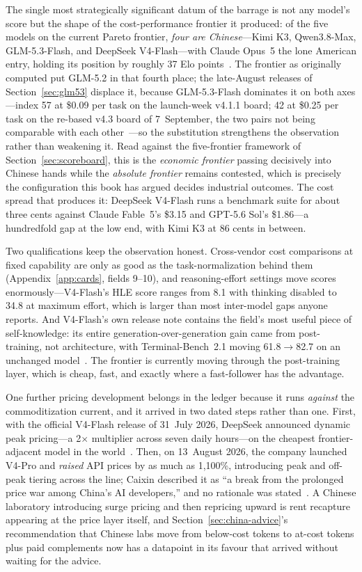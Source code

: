 The single most strategically significant datum of the barrage is not any model's score but the shape of the cost-performance frontier it produced: of the five models on the current Pareto frontier, \emph{four are Chinese}---Kimi K3, Qwen3.8-Max, GLM-5.3-Flash, and DeepSeek V4-Flash---with Claude Opus~5 the lone American entry, holding its position by roughly 37 Elo points~\cite{pareto-frontier}. The frontier as originally computed put GLM-5.2 in that fourth place; the late-August releases of Section~\ref{sec:glm53} displace it, because GLM-5.3-Flash dominates it on both axes---index 57 at \$0.09 per task on the launch-week v4.1.1 board; 42 at \$0.25 per task on the re-based v4.3 board of 7~September, the two pairs not being comparable with each other~\cite{aa-v43,glm53-flash-agentic}---so the substitution strengthens the observation rather than weakening it. Read against the five-frontier framework of Section~\ref{sec:scoreboard}, this is the \emph{economic frontier} passing decisively into Chinese hands while the \emph{absolute frontier} remains contested, which is precisely the configuration this book has argued decides industrial outcomes. The cost spread that produces it: DeepSeek V4-Flash runs a benchmark suite for about three cents against Claude Fable~5's \$3.15 and GPT-5.6 Sol's \$1.86---a hundredfold gap at the low end, with Kimi K3 at 86 cents in between.

Two qualifications keep the observation honest. Cross-vendor cost comparisons at fixed capability are only as good as the task-normalization behind them (Appendix~\ref{app:cards}, fields 9--10), and reasoning-effort settings move scores enormously---V4-Flash's HLE score ranges from 8.1 with thinking disabled to 34.8 at maximum effort, which is larger than most inter-model gaps anyone reports. And V4-Flash's own release note contains the field's most useful piece of self-knowledge: its entire generation-over-generation gain came from post-training, not architecture, with Terminal-Bench~2.1 moving 61.8$\to$82.7 on an unchanged model~\cite{v4flash}. The frontier is currently moving through the post-training layer, which is cheap, fast, and exactly where a fast-follower has the advantage.

One further pricing development belongs in the ledger because it runs \emph{against} the commoditization current, and it arrived in two dated steps rather than one. First, with the official V4-Flash release of 31~July 2026, DeepSeek announced dynamic peak pricing---a 2$\times$ multiplier across seven daily hours---on the cheapest frontier-adjacent model in the world~\cite{v4flash}. Then, on 13~August 2026, the company launched V4-Pro and \emph{raised} API prices by as much as 1{,}100\%, introducing peak and off-peak tiering across the line; Caixin described it as ``a break from the prolonged price war among China's AI developers,'' and no rationale was stated~\cite{deepseek-raise}. A Chinese laboratory introducing surge pricing and then repricing upward is rent recapture appearing at the price layer itself, and Section~\ref{sec:china-advice}'s recommendation that Chinese labs move from below-cost tokens to at-cost tokens plus paid complements now has a datapoint in its favour that arrived without waiting for the advice.


